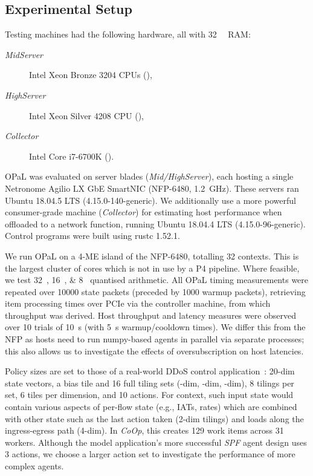\documentclass[
sigconf,natbib=false
]{acmart}
\newcommand{\approachshort}{OPaL}
\newcommand{\Coopfw}{\emph{CoOp}}
\begin{document}
\subsection{Experimental Setup}\label{sec:experimental-setup}
Testing machines had the following hardware, all with \SI{32}{\gibi\byte} RAM:
\begin{description}
	\item[\emph{MidServer}] Intel Xeon Bronze 3204 CPUs (),
	\item[\emph{HighServer}] Intel Xeon Silver 4208 CPU (),
	\item[\emph{Collector}] Intel Core i7-6700K ().
\end{description}
\approachshort{} was evaluated on server blades (\emph{Mid/HighServer}), each hosting a single Netronome Agilio LX GbE SmartNIC (NFP-6480, \SI{1.2}{\giga\hertz}).
These servers ran Ubuntu 18.04.5 LTS (4.15.0-140-generic).
We additionally use a more powerful consumer-grade machine (\emph{Collector}) for estimating host performance when offloaded to a network function, running Ubuntu 18.04.4 LTS (4.15.0-96-generic).
Control programs were built using rustc 1.52.1.

We run \approachshort{} on a \num{4}-ME island of the NFP-6480, totalling \num{32} contexts.
This is the largest cluster of cores which is not in use by a P4 pipeline.
Where feasible, we test \SIlist{32;16;8}{\bit} quantised arithmetic.
All \approachshort{} timing measurements were repeated over \num{10000} state packets (preceded by \num{1000} warmup packets), retrieving item processing times over PCIe via the controller machine, from which throughput was derived.
Host throughput and latency measures were observed over \num{10} trials of \SI{10}{\second} (with \SI{5}{\second} warmup/cooldown times).
We differ this from the NFP as hosts need to run numpy-based agents in parallel via separate processes; this also allows us to investigate the effects of oversubscription on host latencies.

Policy sizes are set to those of a real-world DDoS control application~\parencite{DBLP:journals/tnsm/SimpsonRP20}: 20-dim state vectors, a bias tile and 16 full tiling sets (-dim, -dim, -dim), 8 tilings per set, 6 tiles per dimension, and 10 actions.
For context, such input state would contain various aspects of per-flow state (e.g., IATs, rates) which are combined with other state such as the last action taken (2-dim tilings) and loads along the ingress-egress path (4-dim).
In \Coopfw{}, this creates \num{129} work items across \num{31} workers.
Although the model application's more successful \emph{SPF} agent design uses 3 actions, we choose a larger action set to investigate the performance of more complex agents.
\end{document}
